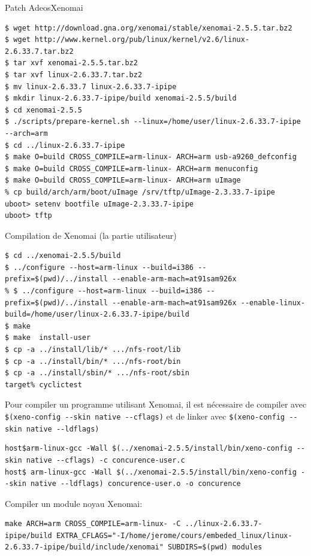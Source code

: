 \begin{frame}[fragile=singleslide]{Patch Adeos}{Xenomai}
  \begin{lstlisting}[basicstyle=\ttfamily\scriptsize\color{colBasic}]
$ wget http://download.gna.org/xenomai/stable/xenomai-2.5.5.tar.bz2
$ wget http://www.kernel.org/pub/linux/kernel/v2.6/linux-2.6.33.7.tar.bz2
$ tar xvf xenomai-2.5.5.tar.bz2 
$ tar xvf linux-2.6.33.7.tar.bz2
$ mv linux-2.6.33.7 linux-2.6.33.7-ipipe
$ mkdir linux-2.6.33.7-ipipe/build xenomai-2.5.5/build
$ cd xenomai-2.5.5
$ ./scripts/prepare-kernel.sh --linux=/home/user/linux-2.6.33.7-ipipe --arch=arm
$ cd ../linux-2.6.33.7-ipipe 
$ make O=build CROSS_COMPILE=arm-linux- ARCH=arm usb-a9260_defconfig
$ make O=build CROSS_COMPILE=arm-linux- ARCH=arm menuconfig
$ make O=build CROSS_COMPILE=arm-linux- ARCH=arm uImage
% cp build/arch/arm/boot/uImage /srv/tftp/uImage-2.3.33.7-ipipe
uboot> setenv bootfile uImage-2.3.33.7-ipipe
uboot> tftp
\end{lstlisting}
Compilation de Xenomai (la partie utilisateur)
  \begin{lstlisting}[basicstyle=\ttfamily\scriptsize\color{colBasic}]
$ cd ../xenomai-2.5.5/build
$ ../configure --host=arm-linux --build=i386 --prefix=$(pwd)/../install --enable-arm-mach=at91sam926x
% $ ../configure --host=arm-linux --build=i386 --prefix=$(pwd)/../install --enable-arm-mach=at91sam926x --enable-linux-build=/home/user/linux-2.6.33.7-ipipe/build
$ make
$ make  install-user
$ cp -a ../install/lib/* .../nfs-root/lib
$ cp -a ../install/bin/* .../nfs-root/bin
$ cp -a ../install/sbin/* .../nfs-root/sbin
target% cyclictest 
  \end{lstlisting} %
Pour compiler un programme utilisant Xenomai, il est nécessaire de compiler avec \verb+$(xeno-config --skin native --cflags)+ et de linker avec \verb+$(xeno-config --skin native --ldflags)+
  \begin{lstlisting}[basicstyle=\ttfamily\scriptsize\color{colBasic}]
host$arm-linux-gcc -Wall $(../xenomai-2.5.5/install/bin/xeno-config --skin native --cflags) -c concurence-user.c
host$ arm-linux-gcc -Wall $(../xenomai-2.5.5/install/bin/xeno-config --skin native --ldflags) concurence-user.o -o concurence
\end{lstlisting} %
Compiler un module noyau Xenomai:
\begin{lstlisting}
make ARCH=arm CROSS_COMPILE=arm-linux- -C ../linux-2.6.33.7-ipipe/build EXTRA_CFLAGS="-I/home/jerome/cours/embeded_linux/linux-2.6.33.7-ipipe/build/include/xenomai" SUBDIRS=$(pwd) modules
\end{lstlisting} %
\end{frame}


